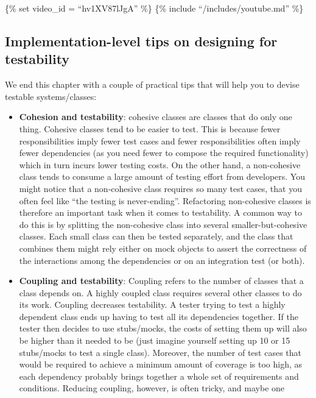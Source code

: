 \{\% set video\_id = ``hv1XV87lJgA'' \%\} \{\% include
``/includes/youtube.md'' \%\}

\hypertarget{implementation-level-tips-on-designing-for-testability}{%
\subsection{Implementation-level tips on designing for
testability}\label{implementation-level-tips-on-designing-for-testability}}

We end this chapter with a couple of practical tips that will help you
to devise testable systems/classes:

\begin{itemize}
\item
  \textbf{Cohesion and testability}: cohesive classes are classes that
  do only one thing. Cohesive classes tend to be easier to test. This is
  because fewer responsibilities imply fewer test cases and fewer
  responsibilities often imply fewer dependencies (as you need fewer to
  compose the required functionality) which in turn incurs lower testing
  costs. On the other hand, a non-cohesive class tends to consume a
  large amount of testing effort from developers. You might notice that
  a non-cohesive class requires so many test cases, that you often feel
  like ``the testing is never-ending''. Refactoring non-cohesive classes
  is therefore an important task when it comes to testability. A common
  way to do this is by splitting the non-cohesive class into several
  smaller-but-cohesive classes. Each small class can then be tested
  separately, and the class that combines them might rely either on mock
  objects to assert the correctness of the interactions among the
  dependencies or on an integration test (or both).
\item
  \textbf{Coupling and testability}: Coupling refers to the number of
  classes that a class depends on. A highly coupled class requires
  several other classes to do its work. Coupling decreases testability.
  A tester trying to test a highly dependent class ends up having to
  test all its dependencies together. If the tester then decides to use
  stubs/mocks, the costs of setting them up will also be higher than it
  needed to be (just imagine yourself setting up 10 or 15 stubs/mocks to
  test a single class). Moreover, the number of test cases that would be
  required to achieve a minimum amount of coverage is too high, as each
  dependency probably brings together a whole set of requirements and
  conditions. Reducing coupling, however, is often tricky, and maybe one

\end{itemize}
